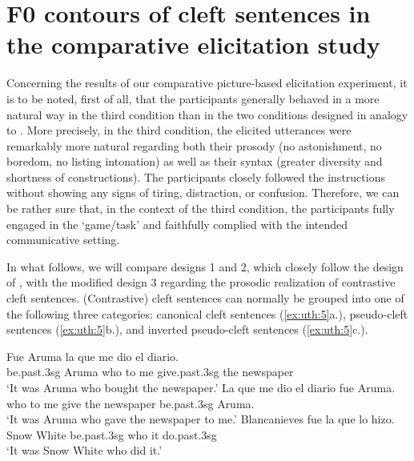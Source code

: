 \documentclass[output=paper]{langsci/langscibook}
\begin{document}
\section{F0 contours of cleft sentences in the comparative elicitation study}
\label{sec:uth:4}
Concerning the results of our comparative picture-based elicitation experiment, it is to be noted, first of all, that the participants generally behaved in a more natural way in the third condition than in the two conditions designed in analogy to \citet{Gabriel2007}. More precisely, in the third condition, the elicited utterances were remarkably more natural regarding both their prosody (no astonishment, no boredom, no listing intonation) as well as their syntax (greater diversity and shortness of constructions). The participants closely followed the instructions without showing any signs of tiring, distraction, or confusion. Therefore, we can be rather sure that, in the context of the third condition, the participants fully engaged in the ‘game/task’ and faithfully complied with the intended communicative setting. 

In what follows, we will compare designs 1 and 2, which closely follow the design of \citet{Gabriel2007}, with the modified design 3 regarding the prosodic realization of contrastive cleft sentences. (Contrastive) cleft sentences can normally be grouped into one of the following three categories: canonical cleft sentences (\ref{ex:uth:5}a.), pseudo-cleft sentences (\ref{ex:uth:5}b.), and inverted pseudo-cleft sentences (\ref{ex:uth:5}c.).   



\ea\label{ex:uth:5}  
  \ea \gll Fue Aruma la que me dio el diario.\\
      be.past.3sg Aruma who to me give.past.3sg the newspaper\\
      \glt      `It was Aruma who bought the newspaper.'
  \ex \gll  La que me dio el diario fue Aruma.\\
      who to me give the newspaper be.past.3sg Aruma.\\
      \glt  `It was Aruma who gave the newspaper to me.'
  \ex \gll  Blancanieves fue la que lo hizo.\\
      Snow White be.past.3sg who it do.past.3sg\\
	\glt `It was Snow White who did it.'
  \z
\z
\end{document}
